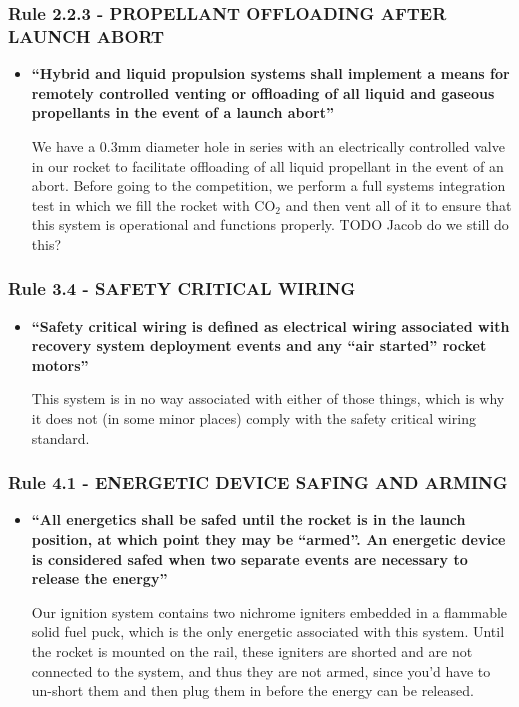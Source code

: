 \documentclass[letter]{article}
\begin{document}
\subsubsection{Rule 2.2.3 - PROPELLANT OFFLOADING AFTER LAUNCH ABORT}
\begin{itemize}
\item {\bfseries ``Hybrid and liquid propulsion systems shall implement a means for remotely controlled venting or offloading of all
liquid and gaseous propellants in the event of a launch abort''}

We have a 0.3mm diameter hole in series with an electrically controlled valve in our
rocket to facilitate offloading of all liquid propellant in the event of an abort.
Before going to the competition, we perform a full systems integration test in which
we fill the rocket with CO$_2$ and then vent all of it to ensure that this system is
operational and functions properly. TODO Jacob do we still do this?
\end{itemize}
\subsubsection{Rule 3.4 - SAFETY CRITICAL WIRING}
\begin{itemize}
\item {\bfseries ``Safety critical wiring is defined as electrical wiring associated with recovery system
deployment events and any ``air started'' rocket motors''}

This system is in no way associated with either of those things, which is why
it does not (in some minor places) comply with the safety critical wiring
standard.
\end{itemize}
\subsubsection{Rule 4.1 - ENERGETIC DEVICE SAFING AND ARMING}
\begin{itemize}
\item {\bfseries ``All energetics shall be safed until the rocket is in the launch position, at which point they may be ``armed''. An energetic
device is considered safed when two separate events are necessary to release the energy''}

Our ignition system contains two nichrome igniters embedded in a flammable solid
fuel puck, which is the only energetic associated with this system. Until the
rocket is mounted on the rail, these igniters are shorted and are not connected
to the system, and thus they are not armed, since you'd have to un-short them and
then plug them in before the energy can be released.
\end{itemize}
\end{document}

